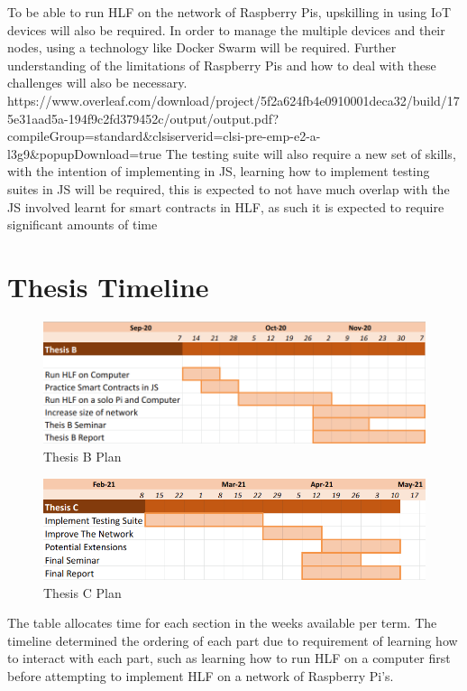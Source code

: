 To be able to run HLF on the network of Raspberry Pis, upskilling in using IoT devices will also be required. In order to manage the multiple devices and their nodes, using a technology like Docker Swarm will be required. Further understanding of the limitations of Raspberry Pis and how to deal with these challenges will also be necessary.
https://www.overleaf.com/download/project/5f2a624fb4e0910001deca32/build/175e31aad5a-194f9c2fd379452c/output/output.pdf?compileGroup=standard&clsiserverid=clsi-pre-emp-e2-a-l3g9&popupDownload=true
The testing suite will also require a new set of skills, with the intention of implementing in JS, learning how to implement testing suites in JS will be required, this is expected to not have much overlap with the JS involved learnt for smart contracts in HLF, as such it is expected to require significant amounts of time 

\section{Thesis Timeline}

    \begin{figure}[!htb]
        \centering
        \includegraphics[width=\columnwidth]{images/termB.png}
        \caption{Thesis B Plan}
        \label{fig:my_label}
    \end{figure}
    
    \begin{figure}[!htb]
        \centering
        \includegraphics[width=\columnwidth]{images/C Plan.png}
        \caption{Thesis C Plan}
        \label{fig:my_label}
    \end{figure}
    
 
    The table allocates time for each section in the weeks available per term. The timeline determined the ordering of each part due to requirement of learning how to interact with each part, such as learning how to run HLF on a computer first before attempting to implement HLF on a network of Raspberry Pi's.
    
